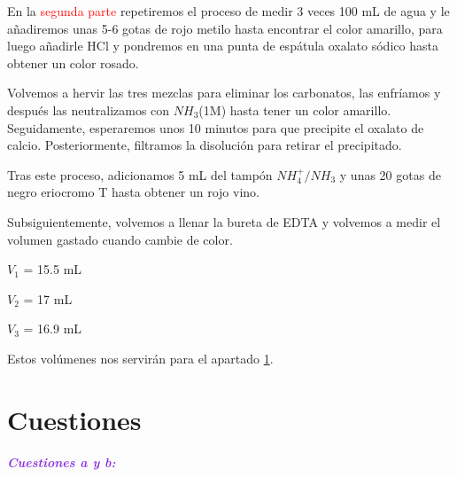 \vspace{0.2cm}

\noindent En la \textcolor{red}{segunda parte} repetiremos el proceso de medir 3 veces 100 mL de agua y le añadiremos unas 5-6 gotas de rojo metilo hasta encontrar el color amarillo, para luego añadirle HCl y pondremos en una punta de espátula oxalato sódico hasta obtener un color rosado. 

\vspace{0.1cm}

\noindent Volvemos a hervir las tres mezclas para eliminar los carbonatos, las enfríamos y después las neutralizamos con $NH_3$(1M) hasta tener un color amarillo. Seguidamente, esperaremos unos 10 minutos para que precipite el oxalato de calcio. Posteriormente, filtramos la disolución para retirar el precipitado. 

\vspace{0.1cm}

\noindent Tras este proceso, adicionamos 5 mL del tampón $NH_4^+/NH_3$ y unas 20 gotas de negro eriocromo T hasta obtener un rojo vino. 

\vspace{0.1cm}

\noindent Subsiguientemente, volvemos a llenar la bureta de EDTA y volvemos a medir el volumen gastado cuando cambie de color.

\vspace{-0.2cm}
\begin{multicols}{3}
\vspace{0.3cm}

$V_1$ = 15.5 mL

\vspace{0.1cm}

$V_2$ = 17 mL

\vspace{0.1cm}

$V_3$ = 16.9 mL

\vspace{0.3cm}
\end{multicols}

\noindent Estos volúmenes nos servirán para el apartado \ref{cuest}.


\clearpage
\section{Cuestiones}\label{cuest}   

\noindent\textcolor{BlueViolet}{\textbf{\textit{Cuestiones a y b:}}}


